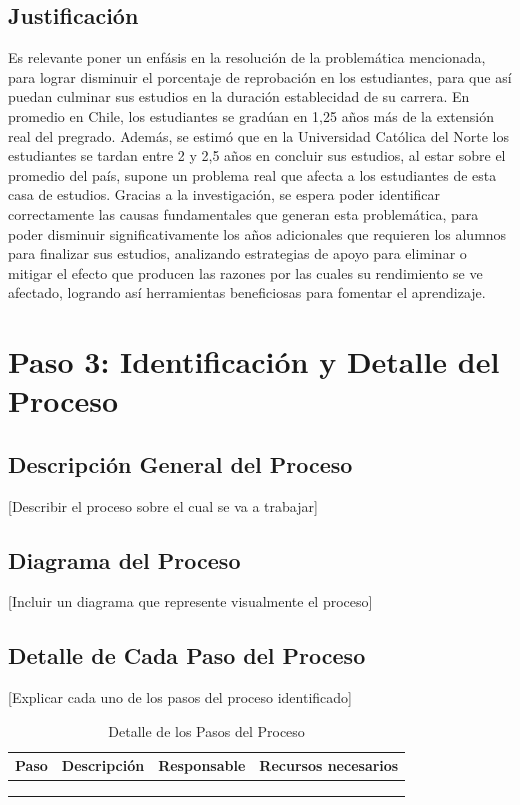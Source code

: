 \documentclass[12pt,letterpaper]{report}
\begin{document}
\subsection{Justificación}
Es relevante poner un enfásis en la resolución de la problemática mencionada, para lograr disminuir el porcentaje de reprobación en los estudiantes, para que así puedan culminar sus estudios en la duración establecidad de su carrera. En promedio en Chile, los estudiantes se gradúan en 1,25 años más de la extensión real del pregrado. Además, se estimó que en la Universidad Católica del Norte los estudiantes se tardan entre 2 y 2,5 años en concluir sus estudios, al estar sobre el promedio del país, supone un problema real que afecta a los estudiantes de esta casa de estudios.
Gracias a la investigación, se espera poder identificar correctamente las causas fundamentales que generan esta problemática, para poder disminuir significativamente los años adicionales que requieren los alumnos para finalizar sus estudios, analizando estrategias de apoyo para eliminar o mitigar el efecto que producen las razones por las cuales su rendimiento se ve afectado, logrando así herramientas beneficiosas para fomentar el aprendizaje.
\section{Paso 3: Identificación y Detalle del Proceso}

\subsection{Descripción General del Proceso}
[Describir el proceso sobre el cual se va a trabajar]

\subsection{Diagrama del Proceso}
[Incluir un diagrama que represente visualmente el proceso]

\subsection{Detalle de Cada Paso del Proceso}
[Explicar cada uno de los pasos del proceso identificado]

\begin{table}[H]
    \centering
    \begin{tabularx}{\textwidth}{|X|X|X|X|}
        \hline
        \textbf{Paso} & \textbf{Descripción} & \textbf{Responsable} & \textbf{Recursos necesarios} \\
        \hline
        & & & \\
        \hline
        & & & \\
        \hline
        & & & \\
        \hline
    \end{tabularx}
    \caption{Detalle de los Pasos del Proceso}
\end{table}
\end{document}
